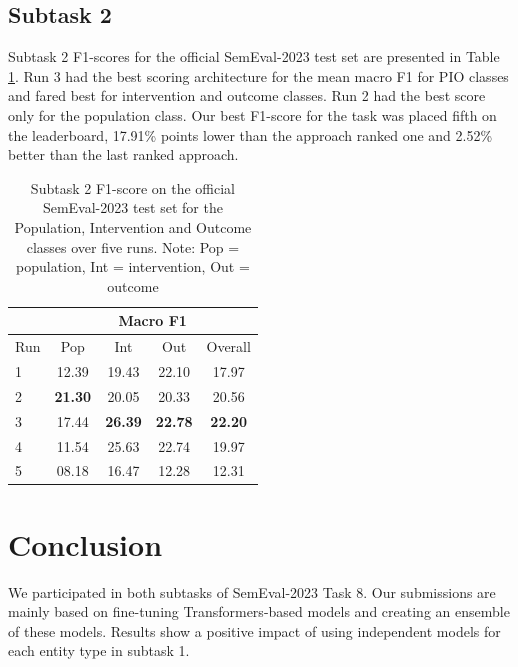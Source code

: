 \documentclass[11pt]{article}
\begin{document}
\subsection{Subtask 2}
\label{res:task2}
%
Subtask 2 F1-scores for the official SemEval-2023 test set are presented in Table \ref{tab:task_2}.
Run 3 had the best scoring architecture for the mean macro F1 for PIO classes and fared best for intervention and outcome classes.
Run 2 had the best score only for the population class.
Our best F1-score for the task was placed fifth on the leaderboard, 17.91\% points lower than the approach ranked one and 2.52\% better than the last ranked approach.
%
\begin{table}[ht]
    \centering
    \begin{tabular}{lcccc}
        \toprule
          & \multicolumn{4}{c}{Macro F1} \\
         \hline
        Run & Pop & Int & Out & Overall \\
        \midrule
        1 & 12.39 & 19.43 & 22.10 & 17.97 \\
        2 & \textbf{21.30} & 20.05 & 20.33 & 20.56  \\
        3 & 17.44 & \textbf{26.39} & \textbf{22.78} & \textbf{22.20} \\
        4 & 11.54 & 25.63 & 22.74 & 19.97 \\
        5 & 08.18 & 16.47 & 12.28 & 12.31 \\
        \bottomrule
    \end{tabular}
    \caption{Subtask 2 F1-score on the official SemEval-2023 test set for the Population, Intervention and Outcome classes over five runs. Note: Pop = population, Int = intervention, Out = outcome}
    \label{tab:task_2}
\end{table}
%
%
%
\section{Conclusion}
%

We participated in both subtasks of SemEval-2023 Task 8.
Our submissions are mainly based on fine-tuning Transformers-based models and creating an ensemble of these models.
Results show a positive impact of using independent models for each entity type in subtask 1.

%
%
%
\end{document}
